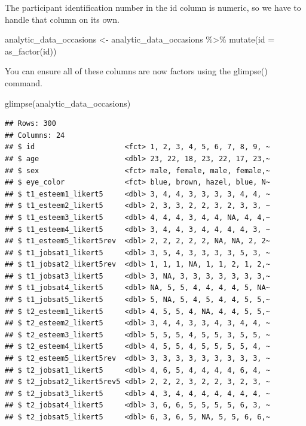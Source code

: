 \documentclass[
]{krantz}
\makeatletter
\newenvironment{Shaded}{\begin{snugshade}}{\end{snugshade}}
\newcommand{\AttributeTok}[1]{\textcolor[rgb]{0.61,0.61,0.61}{#1}}
\newcommand{\FunctionTok}[1]{\textcolor[rgb]{0,0,0}{#1}}
\newcommand{\NormalTok}[1]{#1}
\newcommand{\OtherTok}[1]{\textcolor[rgb]{0.37,0.37,0.37}{#1}}
\newcommand{\SpecialCharTok}[1]{\textcolor[rgb]{0,0,0}{#1}}
\newenvironment{kframe}{%
\medskip{}
\setlength{\fboxsep}{.8em}
 \def\at@end@of@kframe{}%
 \ifinner\ifhmode%
  \def\at@end@of@kframe{\end{minipage}}%
  \begin{minipage}{\columnwidth}%
 \fi\fi%
 \def\FrameCommand##1{\hskip\@totalleftmargin \hskip-\fboxsep
 \colorbox{shadecolor}{##1}\hskip-\fboxsep
     \hskip-\linewidth \hskip-\@totalleftmargin \hskip\columnwidth}%
 \MakeFramed {\advance\hsize-\width
   \@totalleftmargin\z@ \linewidth\hsize
   \@setminipage}}%
 {\par\unskip\endMakeFramed%
 \at@end@of@kframe}
\renewenvironment{Shaded}{\begin{kframe}}{\end{kframe}}
\makeatother
\begin{document}
The participant identification number in the id column is numeric, so we have to handle that column on its own.

\begin{Shaded}
\begin{Highlighting}[]
\NormalTok{analytic\_data\_occasions }\OtherTok{\textless{}{-}}\NormalTok{ analytic\_data\_occasions }\SpecialCharTok{\%\textgreater{}\%}
  \FunctionTok{mutate}\NormalTok{(}\AttributeTok{id =} \FunctionTok{as\_factor}\NormalTok{(id))}
\end{Highlighting}
\end{Shaded}

You can ensure all of these columns are now factors using the glimpse() command.

\begin{Shaded}
\begin{Highlighting}[]
\FunctionTok{glimpse}\NormalTok{(analytic\_data\_occasions)}
\end{Highlighting}
\end{Shaded}

\begin{verbatim}
## Rows: 300
## Columns: 24
## $ id                     <fct> 1, 2, 3, 4, 5, 6, 7, 8, 9, ~
## $ age                    <dbl> 23, 22, 18, 23, 22, 17, 23,~
## $ sex                    <fct> male, female, male, female,~
## $ eye_color              <fct> blue, brown, hazel, blue, N~
## $ t1_esteem1_likert5     <dbl> 3, 4, 4, 3, 3, 3, 3, 4, 4, ~
## $ t1_esteem2_likert5     <dbl> 2, 3, 3, 2, 2, 3, 2, 3, 3, ~
## $ t1_esteem3_likert5     <dbl> 4, 4, 4, 3, 4, 4, NA, 4, 4,~
## $ t1_esteem4_likert5     <dbl> 3, 4, 4, 3, 4, 4, 4, 4, 3, ~
## $ t1_esteem5_likert5rev  <dbl> 2, 2, 2, 2, 2, NA, NA, 2, 2~
## $ t1_jobsat1_likert5     <dbl> 3, 5, 4, 3, 3, 3, 3, 5, 3, ~
## $ t1_jobsat2_likert5rev  <dbl> 1, 1, 1, NA, 1, 1, 2, 1, 2,~
## $ t1_jobsat3_likert5     <dbl> 3, NA, 3, 3, 3, 3, 3, 3, 3,~
## $ t1_jobsat4_likert5     <dbl> NA, 5, 5, 4, 4, 4, 4, 5, NA~
## $ t1_jobsat5_likert5     <dbl> 5, NA, 5, 4, 5, 4, 4, 5, 5,~
## $ t2_esteem1_likert5     <dbl> 4, 5, 5, 4, NA, 4, 4, 5, 5,~
## $ t2_esteem2_likert5     <dbl> 3, 4, 4, 3, 3, 4, 3, 4, 4, ~
## $ t2_esteem3_likert5     <dbl> 5, 5, 5, 4, 5, 5, 3, 5, 5, ~
## $ t2_esteem4_likert5     <dbl> 4, 5, 5, 4, 5, 5, 5, 5, 4, ~
## $ t2_esteem5_likert5rev  <dbl> 3, 3, 3, 3, 3, 3, 3, 3, 3, ~
## $ t2_jobsat1_likert5     <dbl> 4, 6, 5, 4, 4, 4, 4, 6, 4, ~
## $ t2_jobsat2_likert5rev5 <dbl> 2, 2, 2, 3, 2, 2, 3, 2, 3, ~
## $ t2_jobsat3_likert5     <dbl> 4, 3, 4, 4, 4, 4, 4, 4, 4, ~
## $ t2_jobsat4_likert5     <dbl> 3, 6, 6, 5, 5, 5, 5, 6, 3, ~
## $ t2_jobsat5_likert5     <dbl> 6, 3, 6, 5, NA, 5, 5, 6, 6,~
\end{verbatim}
\end{document}
